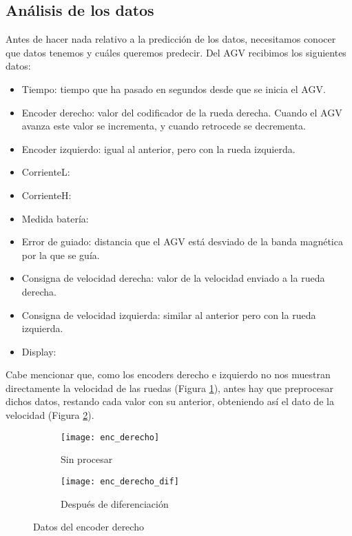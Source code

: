 \subsection{Análisis de los datos}

Antes de hacer nada relativo a la predicción de los datos, necesitamos conocer que datos tenemos y cuáles 
queremos predecir. Del AGV recibimos los siguientes datos:
\begin{itemize}
    \item Tiempo: tiempo que ha pasado en segundos desde que se inicia el AGV.
    \item Encoder derecho: valor del codificador de la rueda derecha. Cuando el AGV avanza este valor se
        incrementa, y cuando retrocede se decrementa.
    \item Encoder izquierdo: igual al anterior, pero con la rueda izquierda.
    \item CorrienteL: %
    \item CorrienteH: %
    \item Medida batería: %
    \item Error de guiado: distancia que el AGV está desviado de la banda magnética por la que se guía.
    \item Consigna de velocidad derecha: valor de la velocidad enviado a la rueda derecha.
    \item Consigna de velocidad izquierda: similar al anterior pero con la rueda izquierda.
    \item Display: %
\end{itemize}

Cabe mencionar que, como los encoders derecho e izquierdo no nos muestran directamente la velocidad de las 
ruedas (Figura \ref{fig:datos_enc_derecho_sp}), antes hay que preprocesar dichos datos, restando cada valor con su anterior, obteniendo así el dato de la 
velocidad (Figura \ref{fig:datos_enc_derecho_dif}).

\begin{figure}[H]
    \centering
    \begin{subfigure}[b]{0.45\textwidth}
        \centering
        \texttt{[image: enc\_derecho]}
        \caption{Sin procesar}
        \label{fig:datos_enc_derecho_sp}
    \end{subfigure}
    \hfill
    \begin{subfigure}[b]{0.45\textwidth}
        \centering
        \texttt{[image: enc\_derecho\_dif]}
        \caption{Después de diferenciación}
        \label{fig:datos_enc_derecho_dif}
    \end{subfigure}
    \caption{Datos del encoder derecho}
    \label{fig:datos_enc_derecho}
\end{figure}

